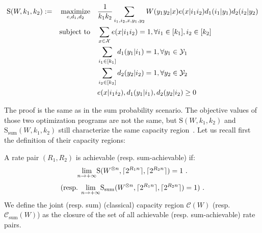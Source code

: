 \begin{equation}
  \begin{aligned}
    \mathrm{S}(W,k_1,k_2) := &&\underset{e,d_1,d_2}{\operatorname{\text{maximize}}} &&& \frac{1}{k_1k_2}\sum_{i_1,i_2,x,y_1,y_2} W(y_1y_2|x)e(x|i_1i_2)d_1(i_1|y_1)d_2(i_2|y_2)\\
    &&\operatorname{\text{subject to}} &&& \sum_{x \in \mathcal{X}} e(x|i_1i_2) = 1, \forall i_1 \in [k_1], i_2 \in [k_2]\\
    &&&&& \sum_{i_1 \in [k_1]} d_1(y_1|i_1) = 1, \forall y_1 \in \mathcal{Y}_1\\
    &&&&& \sum_{i_2 \in [k_2]} d_2(y_2|i_2) = 1, \forall y_2 \in \mathcal{Y}_2\\
    &&&&& e(x|i_1i_2), d_1(y_1|i_1), d_2(y_2|i_2) \geq 0
  \end{aligned}
\end{equation}

The proof is the same as in the sum probability scenario. The objective values of those two optimization programs are not the same, but $\mathrm{S}(W,k_1,k_2)$ and $\mathrm{S}_{\text{sum}}(W,k_1,k_2)$ still characterize the same capacity region~\cite{Willems90}. Let us recall first the definition of their capacity regions:

\begin{defi}
  A rate pair $(R_1,R_2)$ is achievable (resp. sum-achievable) if:
  \[ \underset{n \rightarrow +\infty}{\lim} \mathrm{S}(W^{\otimes n},\ceil{2^{R_1n}},\ceil{2^{R_2n}}) = 1 \ . \]
  \[ \text{(resp. }\underset{n \rightarrow +\infty}{\lim} \mathrm{S}_{\text{sum}}(W^{\otimes n},\lceil2^{R_1n}\rceil,\lceil2^{R_2n}\rceil) = 1 )\ . \]
  We define the joint (resp. sum) (classical) capacity region $\mathcal{C}(W)$ (resp. $\mathcal{C}_{\text{sum}}(W)$) as the closure of the set of all achievable (resp. sum-achievable) rate pairs.
\end{defi}

